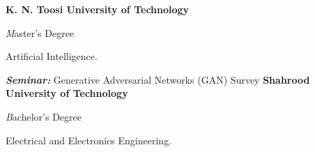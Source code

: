 \begin{rubric}{}

\entry*[2020 -- 2023]%
	\textbf{K. N. Toosi University of Technology} \par {\emph Master's Degree} \par
	{Artificial Intelligence}.
        \par \textbf{\emph{Seminar:}} Generative Adversarial Networks (GAN) Survey
% 
\entry*[2015 -- 2020 ]%
	\textbf{Shahrood University of Technology} \par {\emph Bachelor's Degree} \par
	{Electrical and Electronics Engineering}.

\end{rubric}
